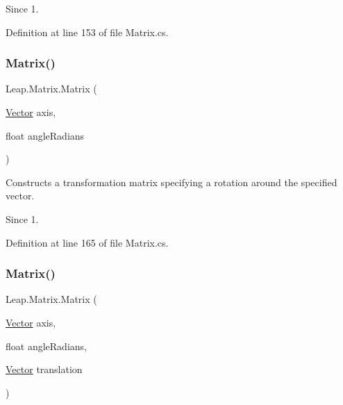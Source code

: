 \begin{DoxySince}{Since}
1. 
\end{DoxySince}


Definition at line 153 of file Matrix.\+cs.

\mbox{\label{struct_leap_1_1_matrix_afa45522d026d02fc0965a3f54128c4b2}} 
\subsubsection{\texorpdfstring{Matrix()}{Matrix()}\hspace{0.1cm}{\footnotesize\ttfamily [4/7]}}
{\footnotesize\ttfamily Leap.\+Matrix.\+Matrix (\begin{DoxyParamCaption}\item[{\mbox{\hyperlink{struct_leap_1_1_vector}{Vector}}}]{axis,  }\item[{float}]{angle\+Radians }\end{DoxyParamCaption})}



Constructs a transformation matrix specifying a rotation around the specified vector. 

\begin{DoxySince}{Since}
1. 
\end{DoxySince}


Definition at line 165 of file Matrix.\+cs.

\mbox{\label{struct_leap_1_1_matrix_a8c05bb05e8ed2e16cd546aa059dbc717}} 
\subsubsection{\texorpdfstring{Matrix()}{Matrix()}\hspace{0.1cm}{\footnotesize\ttfamily [5/7]}}
{\footnotesize\ttfamily Leap.\+Matrix.\+Matrix (\begin{DoxyParamCaption}\item[{\mbox{\hyperlink{struct_leap_1_1_vector}{Vector}}}]{axis,  }\item[{float}]{angle\+Radians,  }\item[{\mbox{\hyperlink{struct_leap_1_1_vector}{Vector}}}]{translation }\end{DoxyParamCaption})}



